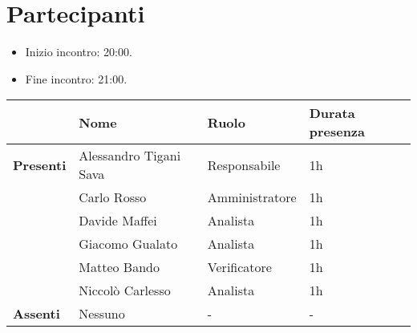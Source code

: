 \section*{Partecipanti}

\begin{itemize}
	\item Inizio incontro: 20:00.
	\item Fine incontro: 21:00.
\end{itemize}


\begin{center}
	\begin{tabular}{llll}
		                  & \textbf{Nome}          & \textbf{Ruolo} & \textbf{Durata presenza} \\
		\hline
		\textbf{Presenti} & Alessandro Tigani Sava & Responsabile 	& 1h	\\
		                  & Carlo Rosso            & Amministratore	& 1h	\\
		                  & Davide Maffei          & Analista		& 1h	\\
		                  & Giacomo Gualato        & Analista		& 1h	\\
		                  & Matteo Bando           & Verificatore	& 1h	\\
		                  & Niccolò Carlesso       & Analista		& 1h	\\
		\hline
		\textbf{Assenti}  & Nessuno                & -              & -		\\
	\end{tabular}
\end{center}
